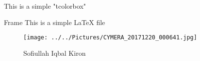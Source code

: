 \documentclass[11 pt]{report}
\begin{document}
\begin{tcolorbox}
 This is a simple "tcolorbox"
\end{tcolorbox}

\begin{frame}{Frame}
 This is a simple \LaTeX{} file
\end{frame}

\begin{figure}[hbtp]
\centering
\texttt{[image: ../../Pictures/CYMERA\_20171220\_000641.jpg]}
\caption{Sofiullah Iqbal Kiron}
\end{figure}
\end{document}
